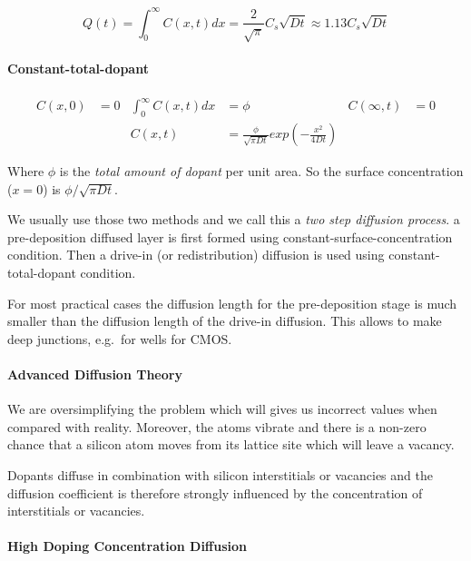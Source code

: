 \documentclass[
]{article}
\begin{document}
\[Q(t) = \int_{0}^\infty C(x,t) dx = \frac{2}{\sqrt{\pi}} C_s \sqrt{Dt} \approx 1.13 C_s \sqrt{Dt}\]

\hypertarget{constant-total-dopant}{%
\paragraph{Constant-total-dopant}\label{constant-total-dopant}}

\[\begin{aligned}
    C(x,0) &= 0 & \int_0^\infty C(x,t) dx &= \phi & C(\infty, t) &= 0\\
     & & C(x,t) &= \frac{\phi}{\sqrt{\pi D t}} exp \left( - \frac{x^2}{4 D t} \right)
\end{aligned}\]

Where \(\phi\) is the \emph{total amount of dopant} per unit area. So
the surface concentration (\(x=0\)) is \(\phi / \sqrt{\pi Dt}\).

We usually use those two methods and we call this a \emph{two step
diffusion process}. a pre-deposition diffused layer is first formed
using constant-surface-concentration condition. Then a drive-in (or
redistribution) diffusion is used using constant-total-dopant condition.

For most practical cases the diffusion length for the pre-deposition
stage is much smaller than the diffusion length of the drive-in
diffusion. This allows to make deep junctions, e.g.~for wells for CMOS.

\hypertarget{advanced-diffusion-theory}{%
\paragraph{Advanced Diffusion Theory}\label{advanced-diffusion-theory}}

We are oversimplifying the problem which will gives us incorrect values
when compared with reality. Moreover, the atoms vibrate and there is a
non-zero chance that a silicon atom moves from its lattice site which
will leave a vacancy.

Dopants diffuse in combination with silicon interstitials or vacancies
and the diffusion coefficient is therefore strongly influenced by the
concentration of interstitials or vacancies.

\hypertarget{high-doping-concentration-diffusion}{%
\paragraph{High Doping Concentration
Diffusion}\label{high-doping-concentration-diffusion}}
\end{document}
